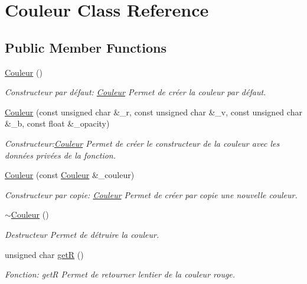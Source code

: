 \hypertarget{classCouleur}{}\section{Couleur Class Reference}
\label{classCouleur}
\subsection*{Public Member Functions}
\begin{DoxyCompactItemize}
\item 
\hyperlink{classCouleur_a687a457edb08b51dbcd0299bb0b6a882}{Couleur} ()
\begin{DoxyCompactList}\small\item\em Constructeur par défaut\+: \hyperlink{classCouleur}{Couleur} Permet de créer la couleur par défaut. \end{DoxyCompactList}\item 
\hyperlink{classCouleur_ac51d4f087f4ff01b84628557dc7a33f4}{Couleur} (const unsigned char \&\+\_\+r, const unsigned char \&\+\_\+v, const unsigned char \&\+\_\+b, const float \&\+\_\+opacity)
\begin{DoxyCompactList}\small\item\em Constructeur\+:\hyperlink{classCouleur}{Couleur} Permet de créer le constructeur de la couleur avec les données privées de la fonction. \end{DoxyCompactList}\item 
\hyperlink{classCouleur_a393a7c4193f593f083d7a25dba062cc5}{Couleur} (const \hyperlink{classCouleur}{Couleur} \&\+\_\+couleur)
\begin{DoxyCompactList}\small\item\em Constructeur par copie\+: \hyperlink{classCouleur}{Couleur} Permet de créer par copie une nouvelle couleur. \end{DoxyCompactList}\item 
\mbox{\label{classCouleur_ad3be30be83649bc5db48ef46b592aec2}} 
\hyperlink{classCouleur_ad3be30be83649bc5db48ef46b592aec2}{$\sim$\+Couleur} ()
\begin{DoxyCompactList}\small\item\em Destructeur Permet de détruire la couleur. \end{DoxyCompactList}\item 
unsigned char \hyperlink{classCouleur_aa3d10f39d94ed884dda69a2420cd3357}{getR} ()
\begin{DoxyCompactList}\small\item\em Fonction\+: getR Permet de retourner l\textquotesingle{}entier de la couleur rouge. \end{DoxyCompactList}\item 

\end{DoxyCompactItemize}
